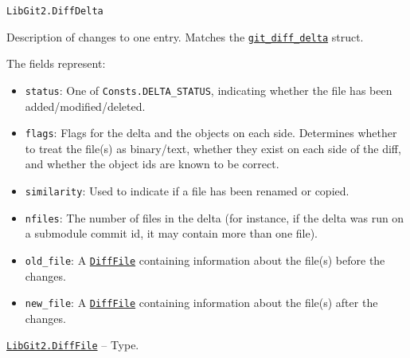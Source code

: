 \begin{adjustwidth}{2em}{0pt}


\begin{verbatim}
LibGit2.DiffDelta
\end{verbatim}

Description of changes to one entry. Matches the \href{https://libgit2.org/libgit2/\#HEAD/type/git\_diff\_delta}{\texttt{git\_diff\_delta}} struct.

The fields represent:

\begin{itemize}
\item \texttt{status}: One of \texttt{Consts.DELTA\_STATUS}, indicating whether the file has been added/modified/deleted.


\item \texttt{flags}: Flags for the delta and the objects on each side. Determines whether to treat the file(s)  as binary/text, whether they exist on each side of the diff, and whether the object ids are known  to be correct.


\item \texttt{similarity}: Used to indicate if a file has been renamed or copied.


\item \texttt{nfiles}: The number of files in the delta (for instance, if the delta  was run on a submodule commit id, it may contain more than one file).


\item \texttt{old\_file}: A \hyperlink{18417152281461649554}{\texttt{DiffFile}} containing information about the file(s) before the changes.


\item \texttt{new\_file}: A \hyperlink{18417152281461649554}{\texttt{DiffFile}} containing information about the file(s) after the changes.

\end{itemize}


\end{adjustwidth}
\hypertarget{18417152281461649554}{} 
\hyperlink{18417152281461649554}{\texttt{LibGit2.DiffFile}}  -- {Type.}

